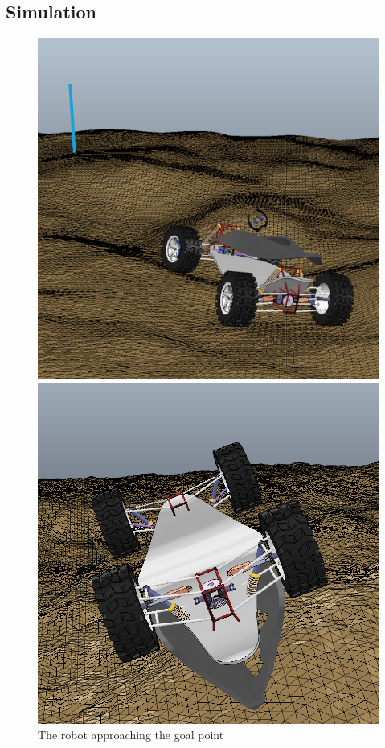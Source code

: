 \documentclass[]{usiinfbachelorproject}
\begin{document}
\subsection{Simulation}
\begin{figure}[h]
  \includegraphics[width=\linewidth]{simulation}
    \caption{The robot approaching the goal point}\label{fig:simulation}
\endminipage\hfill
{}
  \includegraphics[width=\linewidth]{capsized}

\end{figure}
\end{document}
